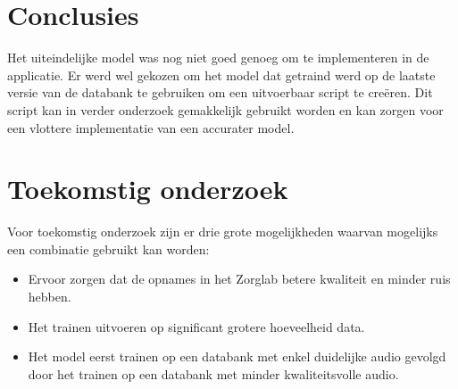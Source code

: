 \documentclass[a0,portrait]{hogent-poster}
\begin{document}
\begin{multicols}{2}
\section{Conclusies}

Het uiteindelijke model was nog niet goed genoeg om te implementeren in de applicatie. Er werd wel gekozen om het model dat getraind werd op de laatste versie van de databank te gebruiken om een uitvoerbaar script te creëren. Dit script kan in verder onderzoek gemakkelijk gebruikt worden en kan zorgen voor een vlottere implementatie van een accurater model.

\section{Toekomstig onderzoek}

Voor toekomstig onderzoek zijn er drie grote mogelijkheden waarvan mogelijks een combinatie gebruikt kan worden:
\begin{itemize}
    \item Ervoor zorgen dat de opnames in het Zorglab betere kwaliteit en minder ruis hebben.
    \item Het trainen uitvoeren op significant grotere hoeveelheid data.
    \item Het model eerst trainen op een databank met enkel duidelijke audio gevolgd door het trainen op een databank met minder kwaliteitsvolle audio.
\end{itemize}

\end{multicols}
\end{document}

